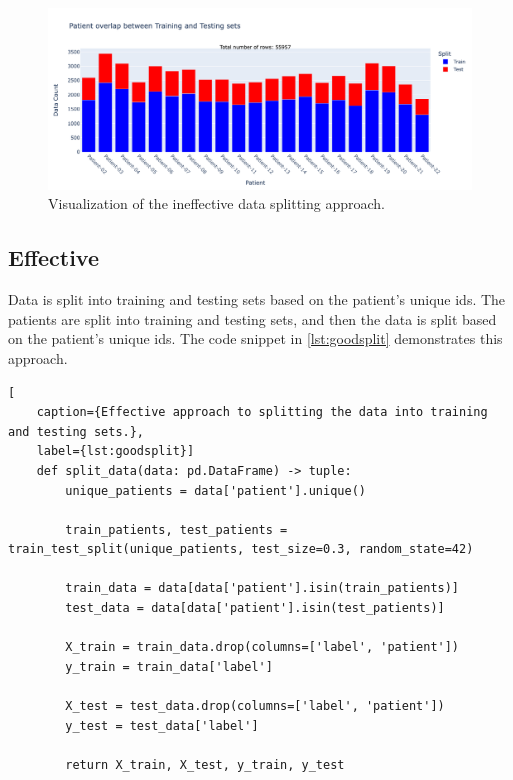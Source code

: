                     \begin{figure}[H]
                        \centering
                        \includegraphics[width=1.0\textwidth]{../src/resources/bad_split.png}
                        \caption{
                            Visualization of the ineffective data splitting approach.
                        }
                        \label{fig:badsplit}
                    \end{figure}
        
                    \newpage

            \subsection{Effective} \label{sec:goodsplit}
            Data is split into training and testing sets based on the patient's unique ids. The patients are split into training and testing sets, and then the data is split based on the patient's unique ids.  The code snippet in \ref{lst:goodsplit} demonstrates this approach.

\begin{lstlisting}[
    caption={Effective approach to splitting the data into training and testing sets.}, 
    label={lst:goodsplit}]
    def split_data(data: pd.DataFrame) -> tuple:    
        unique_patients = data['patient'].unique()

        train_patients, test_patients = train_test_split(unique_patients, test_size=0.3, random_state=42)

        train_data = data[data['patient'].isin(train_patients)]
        test_data = data[data['patient'].isin(test_patients)] 

        X_train = train_data.drop(columns=['label', 'patient'])
        y_train = train_data['label']

        X_test = test_data.drop(columns=['label', 'patient'])
        y_test = test_data['label']
        
        return X_train, X_test, y_train, y_test
\end{lstlisting}

